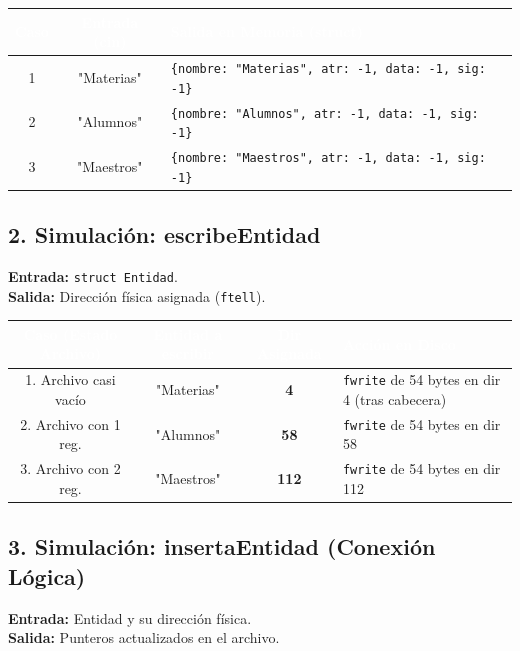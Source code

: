 \documentclass[12pt]{article}
\begin{document}
\begin{table}[H]
\centering
\renewcommand{\arraystretch}{1.05}
\begin{tabular}{|c|c|l|}
\hline
\rowcolor{MainBlue}
\textcolor{white}{\textbf{Caso}} & \textcolor{white}{\textbf{Entrada (cin)}} & \textcolor{white}{\textbf{Salida en Memoria (struct)}} \\
\hline
1 & "Materias" & \verb|{nombre: "Materias", atr: -1, data: -1, sig: -1}| \\
\hline
2 & "Alumnos" & \verb|{nombre: "Alumnos", atr: -1, data: -1, sig: -1}| \\
\hline
3 & "Maestros" & \verb|{nombre: "Maestros", atr: -1, data: -1, sig: -1}| \\
\hline
\end{tabular}
\end{table}

{}
\subsection*{2. Simulación: escribeEntidad}
\textbf{Entrada:} \verb|struct Entidad|.\\
\textbf{Salida:} Dirección física asignada (\verb|ftell|).

\begin{table}[H]
\centering
\renewcommand{\arraystretch}{1.05}
\begin{tabular}{|c|c|c|p{6cm}|}
\hline
\rowcolor{MainBlue}
\textcolor{white}{\textbf{Caso (Estado Archivo)}} & \textcolor{white}{\textbf{Entidad a escribir}} & \textcolor{white}{\textbf{Dir Asignada}} & \textcolor{white}{\textbf{Acción en Disco}} \\
\hline
1. Archivo casi vacío & "Materias" & \textbf{4} & \verb|fwrite| de 54 bytes en dir 4 (tras cabecera) \\
\hline
2. Archivo con 1 reg. & "Alumnos" & \textbf{58} & \verb|fwrite| de 54 bytes en dir 58 \\
\hline
3. Archivo con 2 reg. & "Maestros" & \textbf{112} & \verb|fwrite| de 54 bytes en dir 112 \\
\hline
\end{tabular}
\end{table}

{}
\subsection*{3. Simulación: insertaEntidad (Conexión Lógica)}
\textbf{Entrada:} Entidad y su dirección física. \\
\textbf{Salida:} Punteros actualizados en el archivo.
\end{document}
